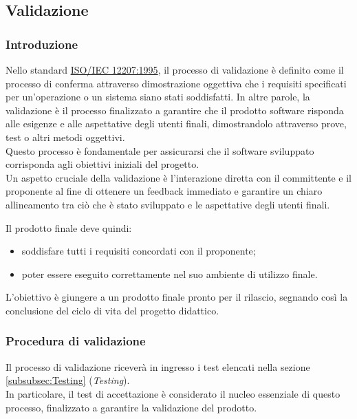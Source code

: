 \subsection{Validazione}

\subsubsection{Introduzione}
Nello standard \href{https://www.math.unipd.it/~tullio/IS-1/2009/Approfondimenti/ISO_12207-1995.pdf}{ISO/IEC 12207:1995}, il processo di validazione è definito come il processo di conferma attraverso dimostrazione oggettiva che i requisiti specificati per un'operazione o un sistema siano stati soddisfatti. In altre parole, la validazione è il processo finalizzato a garantire che il prodotto software risponda alle esigenze e alle aspettative degli utenti finali, dimostrandolo attraverso prove, test o altri metodi oggettivi. \\
Questo processo è fondamentale per assicurarsi che il software sviluppato corrisponda agli obiettivi iniziali del progetto. \\
Un aspetto cruciale della validazione è l'interazione diretta con il committente e il proponente al fine di ottenere un feedback immediato e garantire un chiaro allineamento tra ciò che è stato sviluppato e le aspettative degli utenti finali.

Il prodotto finale deve quindi:
\begin{itemize}
    \item 
        soddisfare tutti i requisiti concordati con il proponente;
    \item 
        poter essere eseguito correttamente nel suo ambiente di utilizzo finale.
\end{itemize}

L'obiettivo è giungere a un prodotto finale pronto per il rilascio, segnando così la conclusione del ciclo di vita del progetto didattico.

\subsubsection{Procedura di validazione}
Il processo di validazione riceverà in ingresso i test elencati nella sezione \ref{subsubsec:Testing} (\textit{Testing}). \\
In particolare, il test di accettazione è considerato il nucleo essenziale di questo processo, finalizzato a garantire la validazione del prodotto.

